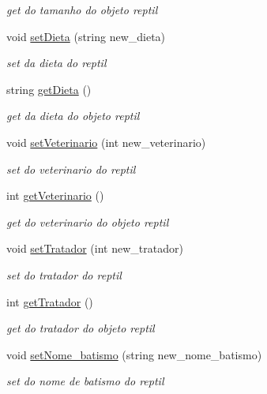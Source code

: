 \begin{DoxyCompactItemize}
\begin{DoxyCompactList}\small\item\em get do tamanho do objeto reptil \end{DoxyCompactList}\item 
void \mbox{\hyperlink{class_reptil_abb1b6999128845c563daa55a4b0cbf92}{set\+Dieta}} (string new\+\_\+dieta)
\begin{DoxyCompactList}\small\item\em set da dieta do reptil \end{DoxyCompactList}\item 
string \mbox{\hyperlink{class_reptil_a920c5c5923067c336b6e608050739e83}{get\+Dieta}} ()
\begin{DoxyCompactList}\small\item\em get da dieta do objeto reptil \end{DoxyCompactList}\item 
void \mbox{\hyperlink{class_reptil_aed6f276b87e0515d73a4788c812db379}{set\+Veterinario}} (int new\+\_\+veterinario)
\begin{DoxyCompactList}\small\item\em set do veterinario do reptil \end{DoxyCompactList}\item 
int \mbox{\hyperlink{class_reptil_a129499f023203e4def4a3f86471c704e}{get\+Veterinario}} ()
\begin{DoxyCompactList}\small\item\em get do veterinario do objeto reptil \end{DoxyCompactList}\item 
void \mbox{\hyperlink{class_reptil_a1b3fa02316b7b5e780539bbb4cff773e}{set\+Tratador}} (int new\+\_\+tratador)
\begin{DoxyCompactList}\small\item\em set do tratador do reptil \end{DoxyCompactList}\item 
int \mbox{\hyperlink{class_reptil_ab019cf835b02de5053c6240c71d99f8f}{get\+Tratador}} ()
\begin{DoxyCompactList}\small\item\em get do tratador do objeto reptil \end{DoxyCompactList}\item 
void \mbox{\hyperlink{class_reptil_ac24d7811c52de75790c1522cf20653fb}{set\+Nome\+\_\+batismo}} (string new\+\_\+nome\+\_\+batismo)
\begin{DoxyCompactList}\small\item\em set do nome de batismo do reptil \end{DoxyCompactList}\item 

\end{DoxyCompactItemize}
